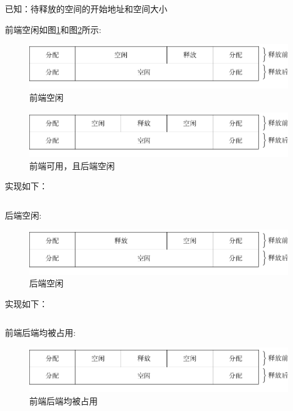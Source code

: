 \documentclass{swfcthesis}
\begin{document}
		已知：待释放的空间的开始地址和空间大小
		
		\newpage

		前端空闲如图\ref{fig:mem0}和图\ref{fig:mem1}所示: 

		\begin{figure}[h]
			\centering
			\includegraphics[width=.7\textwidth]{fig/mem0.pdf}
			\caption{前端空闲}
			\label{fig:mem0}
		\end{figure}

		\begin{figure}[h]
			\centering
			\includegraphics[width=.7\textwidth]{fig/mem1.pdf}
			\caption{前端可用，且后端空闲}
			\label{fig:mem1}
		\end{figure}

		实现如下：

		\begin{listing}[H]
		\inputminted[tabsize=2, firstline=98, lastline=116,
		linenos=true]{c}{../ZOS/src/kernel/memory.c}
		\end{listing}

		后端空闲:

		\begin{figure}[h]
			\centering
			\includegraphics[width=.7\textwidth]{fig/mem2.pdf}
			\caption{后端空闲}
			\label{fig:mem3}
		\end{figure}

		实现如下：

		\begin{listing}[H]
		\inputminted[tabsize=2, firstline=118, lastline=127,
		linenos=true]{c}{../ZOS/src/kernel/memory.c}
		\end{listing}

		前端后端均被占用:

		\begin{figure}[h]
			\centering
			\includegraphics[width=.7\textwidth]{fig/mem3.pdf}
			\caption{前端后端均被占用}
			\label{fig:mem4}
		\end{figure}
\end{document}
